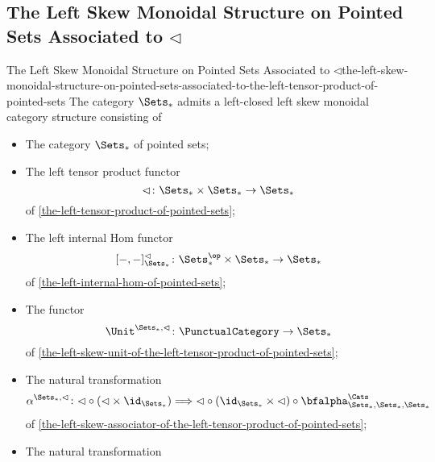 \subsection{The Left Skew Monoidal Structure on Pointed Sets Associated to $\lhd$}\label{subsection-the-left-skew-monoidal-structure-on-pointed-sets-associated-to-the-left-tensor-product-of-pointed-sets}
\begin{proposition}{The Left Skew Monoidal Structure on Pointed Sets Associated to $\lhd$}{the-left-skew-monoidal-structure-on-pointed-sets-associated-to-the-left-tensor-product-of-pointed-sets}%
    The category $\Sets_{*}$ admits a left-closed left skew monoidal category structure consisting of%
    \begin{itemize}
        \item{}The category $\Sets_{*}$ of pointed sets;
        \item{}The left tensor product functor
            \[
                \lhd%
                \colon%
                \Sets_{*}\times\Sets_{*}%
                \to%
                \Sets_{*}
            \]%
            of \cref{the-left-tensor-product-of-pointed-sets};
        \item{}The left internal Hom functor
            \[
                [-,-]^{\lhd}_{\Sets_{*}}%
                \colon%
                \Sets^{\op}_{*}\times\Sets_{*}%
                \to%
                \Sets_{*}%
            \]%
            of \cref{the-left-internal-hom-of-pointed-sets};
        \item{}The functor
            \[
                \Unit^{\Sets_{*},\lhd}
                \colon
                \PunctualCategory
                \to
                \Sets_{*}
            \]
            of \cref{the-left-skew-unit-of-the-left-tensor-product-of-pointed-sets};
        \item{}The natural transformation
            \[
                \alpha^{\Sets_{*},\lhd}%
                \colon%
                {\lhd}\circ{({\lhd}\times\id_{\Sets_{*}})}%
                \Longrightarrow%
                {\lhd}\circ{(\id_{\Sets_{*}}\times{\lhd})}\circ{\bfalpha^{\Cats}_{\Sets_{*},\Sets_{*},\Sets_{*}}}%
            \]
            of \cref{the-left-skew-associator-of-the-left-tensor-product-of-pointed-sets};
        \item{}The natural transformation

\end{itemize}
\end{proposition}
